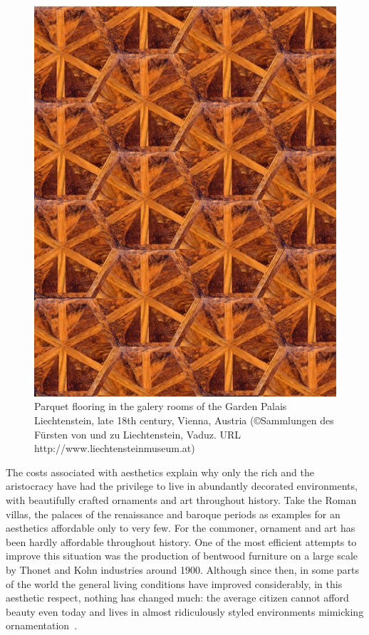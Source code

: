 \documentclass[rmp,amssymb,showpacs,showkeys,12pt,preprint]{revtex4}
\begin{document}
\begin{figure}
\centerline{\includegraphics[width=12cm]{2008-ae-parkett}}
   \caption{Parquet flooring  in the galery rooms of the Garden Palais
 Liechtenstein, late 18th century, Vienna, Austria
(\copyright Sammlungen des F\"ursten von und zu Liechtenstein, Vaduz.
URL http://www.liechtensteinmuseum.at)}
   \label{2005-ae-flooring}
 \end{figure}



The costs associated with aesthetics explain why only the rich and the aristocracy have had the privilege to live in abundantly decorated environments, with beautifully crafted ornaments and art throughout history.
Take the Roman villas,  the palaces of the renaissance and baroque periods as examples for an aesthetics affordable only to very few.
For the commoner, ornament and art has been hardly affordable throughout history.
One of the most efficient attempts to improve this situation was the production of bentwood furniture on a large scale by Thonet and Kohn industries around 1900.
Although since then, in some parts of the world the general living conditions have improved considerably, in this aesthetic respect, nothing has changed much:
the average citizen cannot afford beauty even today and lives in almost ridiculously styled environments mimicking ornamentation~\cite{koel-sack-dw}.
\end{document}
